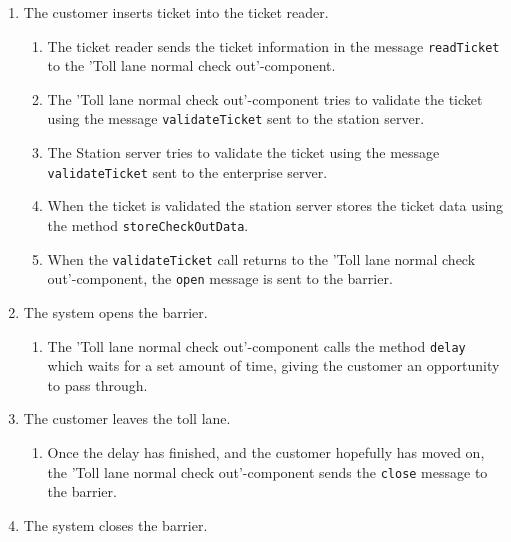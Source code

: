 \begin{enumerate}
\item The customer inserts ticket into the ticket reader.
\begin{enumerate}
\item The ticket reader sends the ticket information in the message \texttt{readTicket} to the 'Toll lane normal check out'-component.
\item The 'Toll lane normal check out'-component tries to validate the ticket using the message \texttt{validateTicket} sent to the station server.
\item The Station server tries to validate the ticket using the message \texttt{validateTicket} sent to the enterprise server.
\item When the ticket is validated the station server stores the ticket data using the method \texttt{storeCheckOutData}.
\item When the \texttt{validateTicket} call returns to the 'Toll lane normal check out'-component, the \texttt{open} message is sent to the barrier.
\end{enumerate}
\item The system opens the  barrier.
\begin{enumerate}
\item The 'Toll lane normal check out'-component calls the method \texttt{delay} which waits for a set amount of time, giving the customer an opportunity to pass through.
\end{enumerate}
\item The customer leaves the toll lane.
\begin{enumerate}
\item Once the delay has finished, and the customer hopefully has moved on, the 'Toll lane normal check out'-component sends the \texttt{close} message to the barrier.
\end{enumerate}
\item The system closes the barrier.

\end{enumerate}
